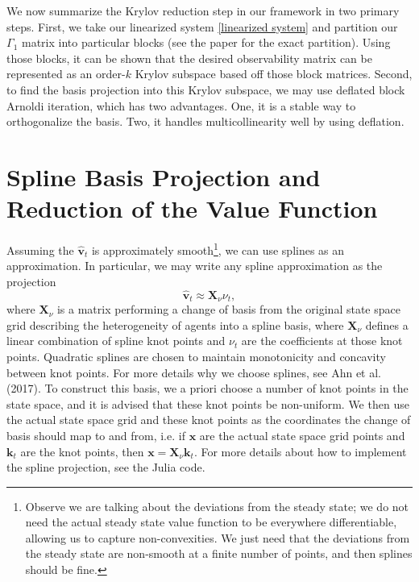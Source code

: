 \documentclass[12 pt, oneside]{article}
\theoremstyle{definition}
\theoremstyle{definition}
\theoremstyle{definition}
\newcommand{\bfk}{\mathbf{k}}
\newcommand{\bfx}{\mathbf{x}}
\newcommand{\bfv}{\mathbf{v}}
\newcommand{\bfX}{\mathbf{X}}
\begin{document}
We now summarize the Krylov reduction step in our framework in two primary steps. First, we take our linearized system \eqref{linearized system} and partition our $\Gamma_1$ matrix into particular blocks (see the paper for the exact partition). Using those blocks, it can be shown that the desired observability matrix can be represented as an order-$k$ Krylov subspace based off those block matrices. Second, to find the basis projection into this Krylov subspace, we may use deflated block Arnoldi iteration, which has two advantages. One, it is a stable way to orthogonalize the basis. Two, it handles multicollinearity well by using deflation.


\section{Spline Basis Projection and Reduction of the Value Function}
Assuming the $\hat{\bfv}_t$ is approximately smooth\footnote{Observe we are talking about the deviations from the steady state; we do not need the actual steady state value function to be everywhere differentiable, allowing us to capture non-convexities. We just need that the deviations from the steady state are non-smooth at a finite number of points, and then splines should be fine.}, we can use splines as an approximation. In particular, we may write any spline approximation as the projection
\begin{equation}
  \label{spline projection}
\hat{\bfv}_t \approx \bfX_\nu \nu_t,
\end{equation}
where $\bfX_\nu$ is a matrix performing a change of basis from the original state space grid describing the heterogeneity of agents into a spline basis, where $\bfX_\nu$ defines a linear combination of spline knot points and $\nu_t$ are the coefficients at those knot points. Quadratic splines are chosen to maintain monotonicity and concavity between knot points. For more details why we choose splines, see Ahn et al. (2017). To construct this basis, we a priori choose a number of knot points in the state space, and it is advised that these knot points be non-uniform. We then use the actual state space grid and these knot points as the coordinates the change of basis should map to and from, i.e. if $\bfx$ are the actual state space grid points and $\bfk_t$ are the knot points, then $\bfx = \bfX_\nu \bfk_t$. For more details about how to implement the spline projection, see the Julia code.
\end{document}
